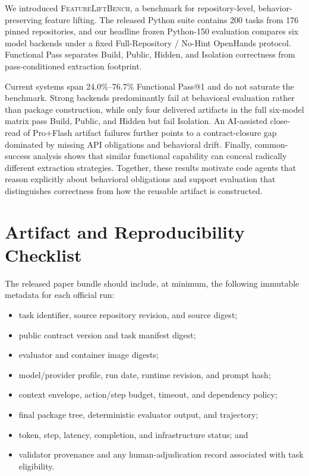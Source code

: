 \documentclass[acmsmall,screen,review,anonymous]{acmart}
\newcommand{\flb}{\textsc{FeatureLiftBench}\xspace}
\begin{document}
We introduced \flb, a benchmark for repository-level, behavior-preserving feature
lifting. The released Python suite contains 200 tasks from 176 pinned repositories,
and our headline frozen Python-150 evaluation compares six model backends under a
fixed Full-Repository / No-Hint OpenHands protocol. Functional Pass separates
Build, Public, Hidden, and Isolation correctness from pass-conditioned extraction
footprint.

Current systems span 24.0\%--76.7\% Functional Pass@1 and do not saturate the
benchmark. Strong backends predominantly fail at behavioral evaluation rather than
package construction, while only four delivered artifacts in the full six-model
matrix pass Build, Public, and Hidden but fail Isolation. An AI-assisted close-read
of Pro+Flash artifact failures further points to a contract-closure gap dominated
by missing API obligations and behavioral drift. Finally, common-success analysis
shows that similar functional capability can conceal radically different extraction
strategies. Together, these results motivate code agents that reason explicitly
about behavioral obligations and support evaluation that distinguishes correctness
from how the reusable artifact is constructed.


\appendix

\section{Artifact and Reproducibility Checklist}
\label{app:reproducibility}

The released paper bundle should include, at minimum, the following immutable
metadata for each official run:
\begin{itemize}
  \item task identifier, source repository revision, and source digest;
  \item public contract version and task manifest digest;
  \item evaluator and container image digests;
  \item model/provider profile, run date, runtime revision, and prompt hash;
  \item context envelope, action/step budget, timeout, and dependency policy;
  \item final package tree, deterministic evaluator output, and trajectory;
  \item token, step, latency, completion, and infrastructure status; and
  \item validator provenance and any human-adjudication record associated with
        task eligibility.
\end{itemize}
\end{document}
